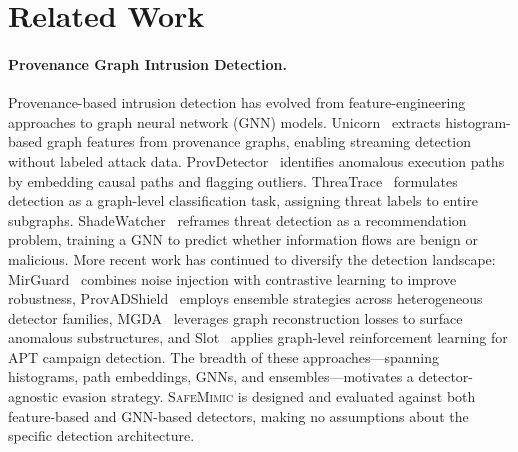 \section{Related Work}
\label{sec:related}

\paragraph{Provenance Graph Intrusion Detection.}
Provenance-based intrusion detection has evolved from feature-engineering approaches to graph neural network (GNN) models.
Unicorn~\cite{unicorn} extracts histogram-based graph features from provenance graphs, enabling streaming detection without labeled attack data.
ProvDetector~\cite{provdetector} identifies anomalous execution paths by embedding causal paths and flagging outliers.
ThreaTrace~\cite{threatrace} formulates detection as a graph-level classification task, assigning threat labels to entire subgraphs.
ShadeWatcher~\cite{shadewatcher} reframes threat detection as a recommendation problem, training a GNN to predict whether information flows are benign or malicious.
More recent work has continued to diversify the detection landscape:
MirGuard~\cite{mirguard} combines noise injection with contrastive learning to improve robustness,
ProvADShield~\cite{provadshield} employs ensemble strategies across heterogeneous detector families,
MGDA~\cite{mgda} leverages graph reconstruction losses to surface anomalous substructures, and
Slot~\cite{slot} applies graph-level reinforcement learning for APT campaign detection.
The breadth of these approaches---spanning histograms, path embeddings, GNNs, and ensembles---motivates a detector-agnostic evasion strategy.
\textsc{SafeMimic} is designed and evaluated against both feature-based and GNN-based detectors, making no assumptions about the specific detection architecture.

